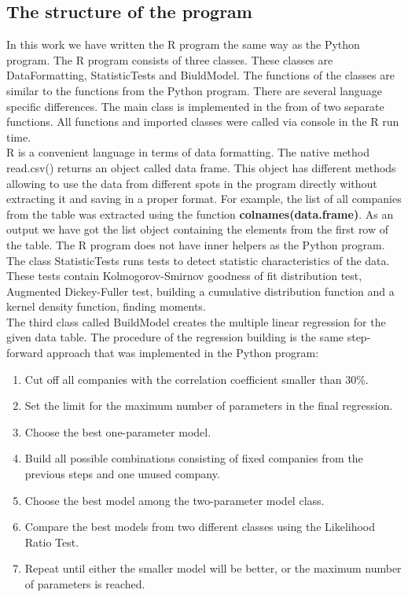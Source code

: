 \documentclass [twoside,
  11pt, a4paper,
  footinclude=true,
  headinclude=true,
  cleardoublepage=empty
]{article}
\begin{document}
\subsection{The structure of the program}
In this work we have written the R program the same way as the Python program. The R program consists of three classes. These classes are DataFormatting, StatisticTests and BiuldModel. The functions of the classes  are similar to the functions from the Python program. There are several language specific differences. The main class is implemented in the from of two separate functions. All functions and imported classes were called via console in the R run time.\\
R is a convenient language in terms of data formatting. The native method read.csv() returns an object called data frame. This object has different methods allowing to use the data from different spots in the program directly without extracting it and saving in a proper format. For example, the list of all companies from the table was extracted using the function \textbf{colnames(data.frame)}. As an output we have got the list object containing the elements from the first row of the table. The R program does not have inner helpers as the Python program.\\
The class StatisticTests runs tests to detect statistic characteristics of the data. These tests contain Kolmogorov-Smirnov goodness of fit distribution test, Augmented Dickey-Fuller test, building a cumulative distribution function and a kernel density function, finding moments.\\
The third class called BuildModel creates the multiple linear regression for  the given data table. The procedure of the regression building is the same step-forward approach that was implemented in the Python program:
\begin{enumerate}
    \item Cut off all companies with the correlation coefficient smaller than 30\%.
    \item Set the limit for the maximum number of parameters in the final regression. 
    \item Choose the best one-parameter model.
    \item Build all possible combinations consisting of fixed companies from the previous steps and one unused company.
    \item Choose the best model among the two-parameter model class.
    \item Compare the best models from two different classes using the Likelihood Ratio Test.
    \item Repeat until either the smaller model will be better, or the maximum number of parameters is reached.
\end{enumerate}
\end{document}
